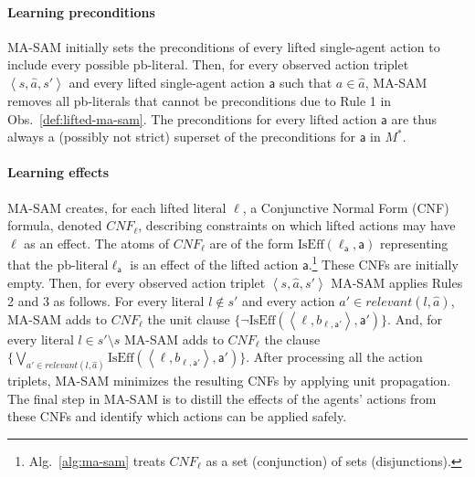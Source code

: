 \documentclass[letterpaper]{article} %
\theoremstyle{definition}
\theoremstyle{remark}
\newcommand{\tuple}[1]{\ensuremath{\left \langle #1 \right \rangle }}
\newcommand{\relevant}{\textit{relevant}}
\newcommand{\cnf}{\textit{CNF}}
\newcommand{\realm}{\ensuremath{M^*}\xspace}
\newcommand{\liftl}{\ensuremath{\ell}}
\newcommand{\lifta}{\mathsf{a}}
\newcommand{\liftatag}{\mathsf{a}'}
\newcommand{\iseff}{\text{IsEff}}
\newcommand{\masam}{\ac{MA-SAM}\xspace}
\newcommand{\pbl}{pb-literal\xspace}
\newcommand{\pbls}{pb-literals\xspace}
\newcommand{\roni}[1]{{\textcolor{red}{[Roni: #1]}}}
\begin{document}
\paragraph{Learning preconditions}
\masam initially sets the preconditions of every lifted single-agent action to include every possible \pbl. 
Then, for every observed action triplet $\tuple{s, \hat{a}, s'}$ 
and every lifted single-agent action $\lifta$ such that $a\in\hat{a}$, 
\masam removes all \pbls that cannot be preconditions due to 
Rule 1 in Obs.~\ref{def:lifted-ma-sam}. 
The preconditions for every lifted action $\lifta$ are thus always a (possibly not strict) superset of the preconditions for $\lifta$ in $\realm$. 

\paragraph{Learning effects} \masam creates, for each lifted literal $\liftl$, a Conjunctive Normal Form (CNF) formula, denoted $\cnf_{\liftl}$, describing constraints on which lifted actions may have $\liftl$ as an effect.
The atoms of $\cnf_{\liftl}$ are of the form $\iseff(\liftl_\lifta, \lifta)$ 
representing that the \pbl $\liftl_\lifta$ is an effect of the lifted action $\lifta$.\footnote{Alg.~\ref{alg:ma-sam} treats $\cnf_{\liftl}$ as a set (conjunction) of sets (disjunctions).} %
These CNFs are initially empty. 
Then, for every observed action triplet $\tuple{s, \hat{a}, s'}$ \masam applies Rules 2 and 3 as follows. 
For every literal $l\notin s'$ and every action $a'\in\relevant(l,\hat{a})$, 
\masam adds to $CNF_{\liftl}$ the unit clause $\{\neg\iseff(\tuple{\liftl, b_{\liftl,\liftatag}}, \liftatag)\}$. 
And, for every literal $l\in s'\setminus s$ 
\masam adds to $\cnf_{\liftl}$ the clause 
$\{\bigvee_{a'\in \relevant(l,\hat{a})} \iseff(\tuple{\liftl, b_{\liftl,\liftatag}}, \liftatag)\}$. 
After processing all the action triplets, \masam minimizes the resulting CNFs by applying unit propagation. %
The final step in \masam is to distill the effects of the agents' actions from these CNFs and identify which actions can be applied safely. 
\end{document}
